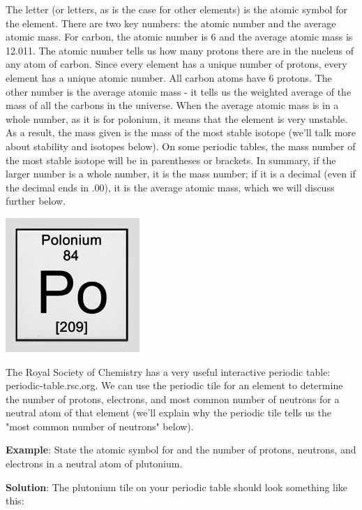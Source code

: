 The letter (or letters, as is the case for other elements) is the atomic symbol
for the element. There are two key numbers: the atomic number and the average
atomic mass. For carbon, the atomic number is 6 and the average atomic mass is
12.011. The atomic number tells us how many protons there are in the nucleus of
any atom of carbon. Since every element has a unique number of protons, every
element has a unique atomic number. All carbon atoms have 6 protons. The other
number is the average atomic mass - it tells us the weighted average of the
mass of all the carbons in the universe. When the average atomic mass is in
a whole number, as it is for polonium, it means that the element is very unstable.
As a result, the mass given is the mass of the most stable isotope (we'll talk
more about stability and isotopes below). On some periodic tables, the mass
number of the most stable isotope will be in parentheses or brackets. In
summary, if the larger number is a whole number, it is the mass number; if it
is a decimal (even if the decimal ends in .00), it is the average atomic mass,
which we will discuss further below.

\begin{center}
\includegraphics[width=2in]{polonium_tile.png}
\end{center}

The Royal Society of Chemistry has a very useful interactive periodic table:
periodic-table.rsc.org. We can use the periodic tile for an element to
determine the number of protons, electrons, and most common number of neutrons
for a neutral atom of that element (we'll explain why the periodic tile tells
us the "most common number of neutrons" below).

\textbf{Example}: State the atomic symbol for and the number of protons,
neutrons, and electrons in a neutral atom of plutonium.

\textbf{Solution}: The plutonium tile on your periodic table should look
something like this:
\begin{center}
\end{center}

